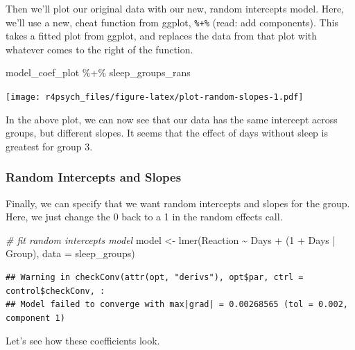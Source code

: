 \documentclass[
]{book}
\newenvironment{Shaded}{\begin{snugshade}}{\end{snugshade}}
\newcommand{\AttributeTok}[1]{\textcolor[rgb]{0.77,0.63,0.00}{#1}}
\newcommand{\CommentTok}[1]{\textcolor[rgb]{0.56,0.35,0.01}{\textit{#1}}}
\newcommand{\DecValTok}[1]{\textcolor[rgb]{0.00,0.00,0.81}{#1}}
\newcommand{\FunctionTok}[1]{\textcolor[rgb]{0.00,0.00,0.00}{#1}}
\newcommand{\NormalTok}[1]{#1}
\newcommand{\OtherTok}[1]{\textcolor[rgb]{0.56,0.35,0.01}{#1}}
\newcommand{\SpecialCharTok}[1]{\textcolor[rgb]{0.00,0.00,0.00}{#1}}
\begin{document}
Then we'll plot our original data with our new, random intercepts model. Here, we'll use a new, cheat function from ggplot, \texttt{\%+\%} (read: add components). This takes a fitted plot from ggplot, and replaces the data from that plot with whatever comes to the right of the function.

\begin{Shaded}
\begin{Highlighting}[]
\NormalTok{model\_coef\_plot }\SpecialCharTok{\%+\%}\NormalTok{ sleep\_groups\_rans}
\end{Highlighting}
\end{Shaded}

\texttt{[image: r4psych\_files/figure-latex/plot-random-slopes-1.pdf]}

In the above plot, we can now see that our data has the same intercept across groups, but different slopes. It seems that the effect of days without sleep is greatest for group 3.

\hypertarget{random-intercepts-and-slopes}{%
\subsubsection{Random Intercepts and Slopes}\label{random-intercepts-and-slopes}}

Finally, we can specify that we want random intercepts and slopes for the group. Here, we just change the 0 back to a 1 in the random effects call.

\begin{Shaded}
\begin{Highlighting}[]
\CommentTok{\# fit random intercepts model}
\NormalTok{model }\OtherTok{\textless{}{-}} \FunctionTok{lmer}\NormalTok{(Reaction }\SpecialCharTok{\textasciitilde{}}\NormalTok{ Days }\SpecialCharTok{+}\NormalTok{ (}\DecValTok{1} \SpecialCharTok{+}\NormalTok{ Days }\SpecialCharTok{|}\NormalTok{ Group), }\AttributeTok{data =}\NormalTok{ sleep\_groups)}
\end{Highlighting}
\end{Shaded}

\begin{verbatim}
## Warning in checkConv(attr(opt, "derivs"), opt$par, ctrl = control$checkConv, :
## Model failed to converge with max|grad| = 0.00268565 (tol = 0.002, component 1)
\end{verbatim}

Let's see how these coefficients look.
\end{document}
